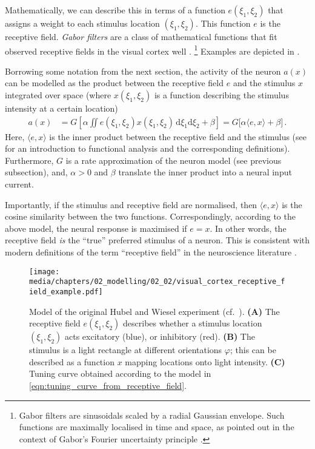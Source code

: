 Mathematically, we can describe this in terms of a function $e(\xi_1, \xi_2)$ that assigns a weight to each stimulus location $(\xi_1, \xi_2)$.
This function $e$ is the receptive field.
\emph{Gabor filters} are a class of mathematical functions that fit observed receptive fields in the visual cortex well \citep{marcelja1980mathematical,field1986structure}.%
\footnote{Gabor filters are sinusoidals scaled by a radial Gaussian envelope. Such functions are maximally localised in time and space, as pointed out in the context of Gabor's Fourier uncertainty principle \citep{gabor1946theory}.}
Examples are depicted in .

Borrowing some notation from the next section, the activity of the neuron $a(x)$ can be modelled as the product between the receptive field $e$ and the stimulus $x$ integrated over space (where $x(\xi_1, \xi_2)$ is a function describing the stimulus intensity at a certain location)
\begin{align}
	a(x) &= G\left[ \alpha \iint e(\xi_1, \xi_2) x(\xi_1, \xi_2) \,\mathrm{d}\xi_1\mathrm{d}\xi_2 + \beta \right]
		= G \bigl[ \alpha \langle e, x \rangle + \beta \bigr] \,.
	\label{eqn:tuning_curve_from_receptive_field}
\end{align}
Here, $\langle e, x \rangle$ is the inner product between the receptive field and the stimulus (see  for an introduction to functional analysis and the corresponding definitions).
Furthermore, $G$ is a rate approximation of the neuron model (see previous subsection), and, $\alpha > 0$ and $\beta$ translate the inner product into a neural input current.

Importantly, if the stimulus and receptive field are normalised, then $\langle e, x \rangle$ is the cosine similarity between the two functions.
Correspondingly, according to the above model, the neural response is maximised if $e = x$.
In other words, the receptive field \emph{is} the \enquote{true} preferred stimulus of a neuron.
This is consistent with modern definitions of the term \enquote{receptive field} in the neuroscience literature \citep[cf.][]{troy2009retinal}.

\begin{figure}
	\centering
	\texttt{[image: media/chapters/02\_modelling/02\_02/visual\_cortex\_receptive\_field\_example.pdf]}
	\caption[Model of the Hubel and Wiesel experiment]{Model of the original Hubel and Wiesel experiment (cf.~). \textbf{(A)} The receptive field $e(\xi_1, \xi_2)$ describes whether a stimulus location $(\xi_1, \xi_2)$ acts excitatory (blue), or inhibitory (red). \textbf{(B)} The stimulus is a light rectangle at different orientations $\varphi$; this can be described as a function $x$ mapping locations onto light intensity. \textbf{(C)} Tuning curve obtained according to the model in \cref{eqn:tuning_curve_from_receptive_field}.}
	\label{fig:visual_cortex_receptive_field_example}
\end{figure}

